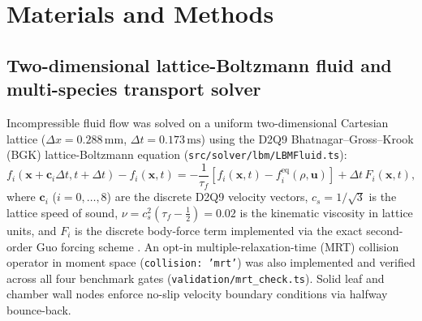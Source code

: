 \documentclass[final,5p,times,twocolumn,numbers,sort&compress]{elsarticle}
\begin{document}
\section{Materials and Methods}\label{sec:methods}

\subsection{Two-dimensional lattice-Boltzmann fluid and multi-species transport solver}

Incompressible fluid flow was solved on a uniform two-dimensional Cartesian lattice ($\Delta x = 0.288\,\mathrm{mm}$, $\Delta t = 0.173\,\mathrm{ms}$) using the D2Q9 Bhatnagar--Gross--Krook (BGK) lattice-Boltzmann equation (\texttt{src/solver/lbm/LBMFluid.ts}):
\begin{equation}
f_i(\mathbf{x}+\mathbf{c}_i\Delta t, t+\Delta t) - f_i(\mathbf{x},t) = -\frac{1}{\tau_f}\left[f_i(\mathbf{x},t) - f_i^{\mathrm{eq}}(\rho,\mathbf{u})\right] + \Delta t\,F_i(\mathbf{x},t),
\label{eq:lbm_bgk}
\end{equation}
where $\mathbf{c}_i$ ($i=0,\dots,8$) are the discrete D2Q9 velocity vectors, $c_s = 1/\sqrt{3}$ is the lattice speed of sound, $\nu = c_s^2(\tau_f - \tfrac{1}{2}) = 0.02$ is the kinematic viscosity in lattice units, and $F_i$ is the discrete body-force term implemented via the exact second-order Guo forcing scheme \citep{guo2002}. An opt-in multiple-relaxation-time (MRT) collision operator in moment space \citep{lallemand2000} (\texttt{collision: 'mrt'}) was also implemented and verified across all four benchmark gates (\texttt{validation/mrt\_check.ts}). Solid leaf and chamber wall nodes enforce no-slip velocity boundary conditions via halfway bounce-back.
\end{document}
